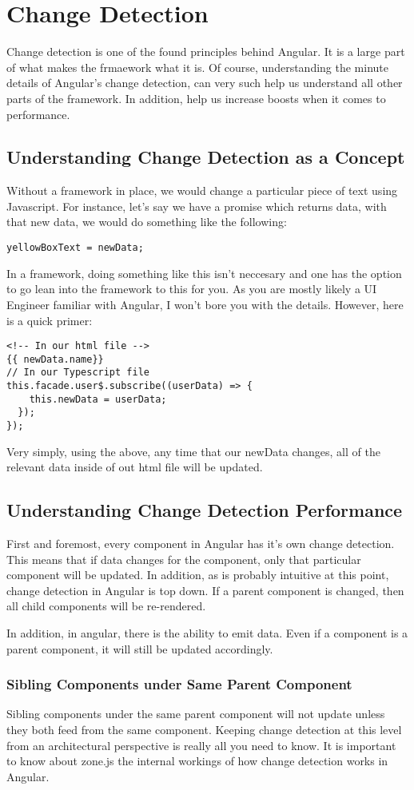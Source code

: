 \chapter{ Change Detection }


Change detection is one of the found principles behind Angular. It is a large
part of what makes the frmaework what it is. Of course, understanding the
minute details of Angular's change detection, can very such help us understand
all other parts of the framework. In addition, help us increase boosts when it
comes to performance.

\section{Understanding Change Detection as a Concept}
Without a framework in place, we would change a particular piece of text
using Javascript. For instance, let's say we have a promise which returns data,
with that new data, we would do something like the following:

\begin{lstlisting}
yellowBoxText = newData;
\end{lstlisting}

In a framework, doing something like this isn't neccesary and one has the option
to go lean into the framework to this for you. As you are mostly likely a UI
Engineer familiar with Angular, I won't bore you with the details. However, here
is a quick primer:
\begin{lstlisting}
<!-- In our html file -->
{{ newData.name}}
// In our Typescript file
this.facade.user$.subscribe((userData) => {
    this.newData = userData;
  });
});
\end{lstlisting}

Very simply, using the above, any time that our newData changes, all of the
relevant data inside of out html file will be updated.

\section{ Understanding Change Detection Performance }
First and foremost, every component in Angular has it's own change detection.
This means that if data changes for the component, only that particular
component will be updated. In addition, as is probably intuitive at this point,
change detection in Angular is top down. If a parent component is changed, then
all child components will be re-rendered.

In addition, in angular, there is the ability to emit data. Even if a component
is a parent component, it will still be updated accordingly.

\subsection{ Sibling Components under Same Parent Component }
Sibling components under the same parent component will not update unless they
both feed from the same component. Keeping change detection at this level
from an architectural perspective is really all you need to know. It is
important to know about zone.js the internal workings of how change detection
works in Angular. 
